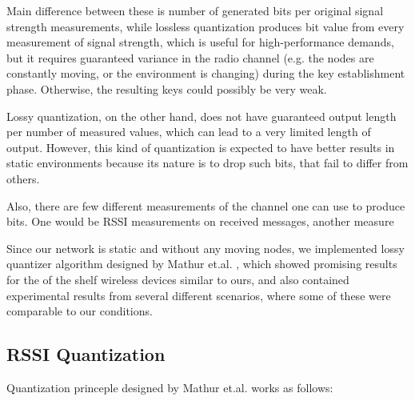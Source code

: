 \documentclass[
  print, %
  table,   %
  nolof,     %
  nolot,     %
           oneside
]{fithesis3}
\begin{document}
    Main difference between these is number of generated bits per original signal strength measurements, while lossless quantization produces bit value from every measurement of signal strength, which is useful for high-performance demands, but it requires guaranteed variance in the radio channel (e.g. the nodes are constantly moving, or the environment is changing) during the key establishment phase. %
    Otherwise, the resulting keys could possibly be very weak. %

    Lossy quantization, on the other hand, does not have guaranteed output length per number of measured values, which can lead to a very limited length of output. However, this kind of quantization is expected to have better results in static environments %
    because its nature is to drop such bits, that fail to differ from others.

    Also, there are few different measurements of the channel one can use to produce bits. One would be RSSI measurements on received messages, another measure %

    Since our network is static and without any moving nodes, we implemented lossy quantizer algorithm designed by Mathur et.al. \cite{Mathur2008Rssi}, which showed promising results for the of the shelf wireless devices similar to ours, and also contained experimental results from several different scenarios, where some of these were comparable to our conditions.



    \subsection{RSSI Quantization}\label{subsec:quant}
    Quantization princeple designed by Mathur et.al. \cite{Mathur2008Rssi}
     works as follows:
\end{document}
